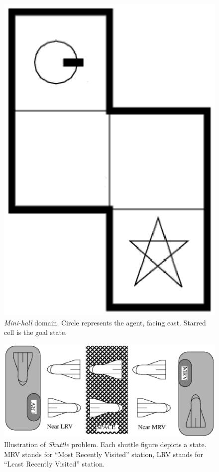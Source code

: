 \documentclass[10pt, conference, compsocconf]{IEEEtran}
\begin{document}
\begin{figure}[t]
\centering
\includegraphics[scale=0.3]{problem-mini-hall}
\caption{\textit{Mini-hall} domain. Circle represents the agent, facing east. Starred cell is the goal state.}
\label{fig:problem-mini-hall}
\end{figure}


\begin{figure}[t]
\centering
\includegraphics[scale=0.4]{problem-shuttle}
\caption{Illustration of \textit{Shuttle} problem. Each shuttle figure depicts a state. MRV stands for ``Most Recently Visited'' station, LRV stands for ``Least Recently Visited'' station.}
\label{fig:problem-shuttle}
\end{figure}
\end{document}
